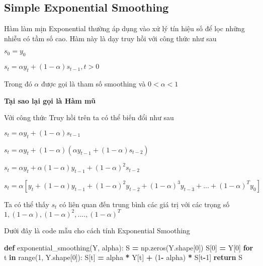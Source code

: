 \documentclass[
]{book}
\newenvironment{Shaded}{\begin{snugshade}}{\end{snugshade}}
\newcommand{\BuiltInTok}[1]{#1}
\newcommand{\ControlFlowTok}[1]{\textcolor[rgb]{0.13,0.29,0.53}{\textbf{#1}}}
\newcommand{\DecValTok}[1]{\textcolor[rgb]{0.00,0.00,0.81}{#1}}
\newcommand{\KeywordTok}[1]{\textcolor[rgb]{0.13,0.29,0.53}{\textbf{#1}}}
\newcommand{\NormalTok}[1]{#1}
\newcommand{\OperatorTok}[1]{\textcolor[rgb]{0.81,0.36,0.00}{\textbf{#1}}}
\begin{document}
\hypertarget{simple-exponential-smoothing}{%
\subsection{Simple Exponential Smoothing}\label{simple-exponential-smoothing}}

Hàm làm mịn Exponential thường áp dụng vào xử lý tín hiệu số để lọc những nhiễu có tầm số cao. Hàm này là dạy truy hồi với công thức như sau

\(s_{0} = y_{0}\)

\(s_{t} = \alpha y_{t} + (1 - \alpha)s_{t-1}, t > 0\)

Trong đó \(\alpha\) được gọi là tham số smoothing và \(0 < \alpha < 1\)

\textbf{Tại sao lại gọi là Hàm mũ}

Với công thức Truy hồi trên ta có thể biến đổi như sau

\(s_t = \alpha y_t + (1 - \alpha)s_{t-1}\)

\(s_t = \alpha y_t + (1 - \alpha)(\alpha y_{t-1} + (1 - \alpha)s_{t-2})\)

\(s_t = \alpha y_t + \alpha(1 - \alpha)y_{t-1} + (1-\alpha)^2s_{t-2}\)

\(s_t = \alpha[y_t + (1 - \alpha)y_{t-1} + (1-\alpha)^2y_{t-2} + (1-\alpha)^3y_{t-3} + ... +(1-\alpha)^Ty_0]\)

Ta có thể thấy \(s_t\) có liên quan đến trung bình các giá trị với các trọng số
\(1, (1-\alpha), (1-\alpha)^2, ....,(1-\alpha)^T\)

Dưới đây là code mẫu cho cách tính Exponential Smoothing

\begin{Shaded}
\begin{Highlighting}[]
\KeywordTok{def}\NormalTok{ exponential\_smoothing(Y, alpha):}
\NormalTok{    S }\OperatorTok{=}\NormalTok{ np.zeros(Y.shape[}\DecValTok{0}\NormalTok{])}
\NormalTok{    S[}\DecValTok{0}\NormalTok{] }\OperatorTok{=}\NormalTok{ Y[}\DecValTok{0}\NormalTok{]}
    \ControlFlowTok{for}\NormalTok{ t }\KeywordTok{in} \BuiltInTok{range}\NormalTok{(}\DecValTok{1}\NormalTok{, Y.shape[}\DecValTok{0}\NormalTok{]):}
\NormalTok{        S[t] }\OperatorTok{=}\NormalTok{ alpha }\OperatorTok{*}\NormalTok{ Y[t] }\OperatorTok{+}\NormalTok{ (}\DecValTok{1}\OperatorTok{{-}}\NormalTok{ alpha) }\OperatorTok{*}\NormalTok{ S[t}\OperatorTok{{-}}\DecValTok{1}\NormalTok{]}
    \ControlFlowTok{return}\NormalTok{ S}
\end{Highlighting}
\end{Shaded}
\end{document}

